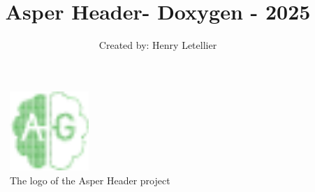 \documentclass{article}
\title{Asper Header- Doxygen - 2025}
\author{Created by: Henry Letellier}
\date{} %
\begin{document}
\maketitle

\begin{figure}[h]
    \centering
    \includegraphics[width=3cm]{./files/icon/favicon.png}
    \caption*{The logo of the Asper Header project}
\end{figure}
\end{document}
